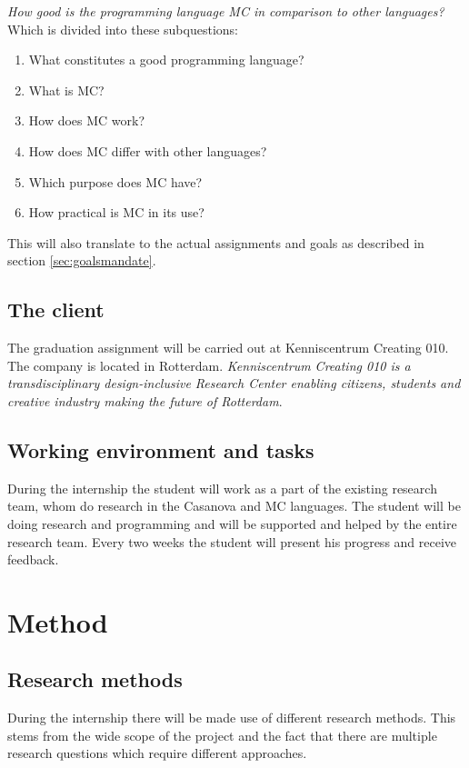 \textit{How good is the programming language MC in comparison to other languages?} \newline
Which is divided into these subquestions:
\begin{enumerate}
   \item What constitutes a good programming language?
   \item What is MC?
   \item How does MC work?
   \item How does MC differ with other languages?
   \item Which purpose does MC have?
   \item How practical is MC in its use?
\end{enumerate}

This will also translate to the actual assignments and goals as described in section \ref{sec:goalsmandate}.

\section{The client}\label{sec:clientmandate}
The graduation assignment will be carried out at Kenniscentrum Creating 010.
The company is located in Rotterdam.
\textit{Kenniscentrum Creating 010 is a transdisciplinary design-inclusive Research Center enabling citizens, students and creative industry making the future of Rotterdam}\cite{creating2016home}.

\section{Working environment and tasks}\label{sec:workenvmandate}
During the internship the student will work as a part of the existing research team, whom do research in the Casanova and MC languages.
The student will be doing research and programming and will be supported and helped by the entire research team.
Every two weeks the student will present his progress and receive feedback.


\chapter{Method}\label{ch:methodmandate}
\section{Research methods}
During the internship there will be made use of different research methods.
This stems from the wide scope of the project and the fact that there are multiple research questions which require different approaches.

